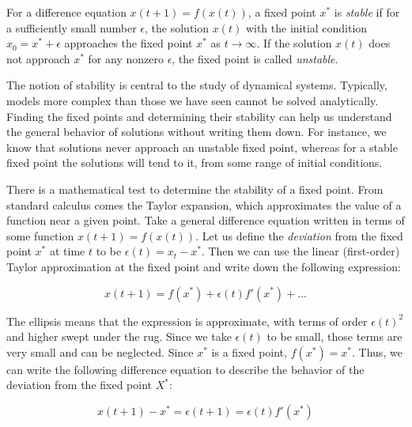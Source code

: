 \documentclass[
  letterpaper,
  DIV=11,
  numbers=noendperiod]{scrreprt}
\begin{document}
\begin{tcolorbox}[enhanced jigsaw, colbacktitle=quarto-callout-note-color!10!white, leftrule=.75mm, coltitle=black, left=2mm, breakable, opacityback=0, colback=white, toprule=.15mm, opacitybacktitle=0.6, bottomtitle=1mm, colframe=quarto-callout-note-color-frame, rightrule=.15mm, bottomrule=.15mm, toptitle=1mm, titlerule=0mm, arc=.35mm, title=\textcolor{quarto-callout-note-color}{\faInfo}\hspace{0.5em}{Definition}]
For a difference equation \(x(t+1) = f(x(t))\), a fixed point \(x^*\) is
\emph{stable} if for a sufficiently small number \(\epsilon\), the
solution \(x(t)\) with the initial condition \(x_0 = x^* + \epsilon\)
approaches the fixed point \(x^*\) as \(t \rightarrow \infty\). If the
solution \(x(t)\) does not approach \(x^*\) for any nonzero
\(\epsilon\), the fixed point is called \emph{unstable}.
\end{tcolorbox}

The notion of stability is central to the study of dynamical systems.
Typically, models more complex than those we have seen cannot be solved
analytically. Finding the fixed points and determining their stability
can help us understand the general behavior of solutions without writing
them down. For instance, we know that solutions never approach an
unstable fixed point, whereas for a stable fixed point the solutions
will tend to it, from some range of initial conditions.

There is a mathematical test to determine the stability of a fixed
point. From standard calculus comes the Taylor expansion, which
approximates the value of a function near a given point. Take a general
difference equation written in terms of some function
\(x(t+1) = f(x(t))\). Let us define the \emph{deviation} from the fixed
point \(x^*\) at time \(t\) to be \(\epsilon(t) = x_{t} - x^*\). Then we
can use the linear (first-order) Taylor approximation at the fixed point
and write down the following expression:

\[ 
x(t+1) = f(x^*) + \epsilon(t) f'(x^*) + ...
\]

The ellipsis means that the expression is approximate, with terms of
order \(\epsilon(t)^2\) and higher swept under the rug. Since we take
\(\epsilon(t)\) to be small, those terms are very small and can be
neglected. Since \(x^*\) is a fixed point, \(f(x^*) = x^*\). Thus, we
can write the following difference equation to describe the behavior of
the deviation from the fixed point \(X^*\):

\[
x(t+1) -  x^* =  \epsilon(t+1)= \epsilon(t) f'(x^*)
\]
\end{document}
